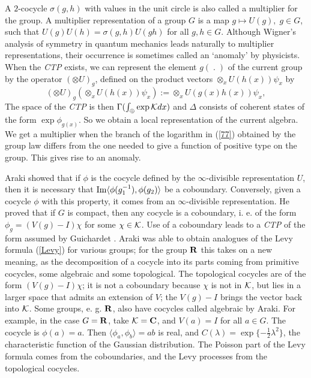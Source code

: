 A $2$-cocycle $\sigma(g,h)$ with values in the unit circle is also
called a multiplier for the group. A multiplier representation of a group
$G$ is a map $g\mapsto U(g),\;g\in G$, such that $U(g)U(h)=\sigma(g,h)U(gh)$
for all $g,h\in G$. Although Wigner's analysis of symmetry in quantum
mechanics leads naturally to multiplier representations, their occurrence
is sometimes called an `anomaly' by physicists.
When the {\em CTP} exists, we can represent the element
$g(\;.\;)$ of the current group by the operator $(\otimes U)_g$, defined on
the product vectors $\otimes_x U(h(x))\psi_x$ by
\begin{equation}
(\otimes U)_g(\otimes_x U(h(x))\psi_x):=\otimes_xU(g(x)h(x))\psi_x,
\label{current}
\end{equation}
The space of the {\em CTP} is then $\Gamma(\int_{\oplus}\exp{\cal K}dx)$
and $\Delta$ consists of coherent states of the form $\exp\phi_{g(x)}$.
So we obtain a local representation of the current algebra. We get a
multiplier when the branch of the logarithm in (\ref{77}) obtained by the
group law differs from the one needed to give a function of positive type on
the group. This gives rise to an anomaly.

Araki showed that if $\phi$ is the cocycle defined by the $\infty$-divisible
representation $U$, then it is necessary that ${\rm Im}\langle
\phi(g_1^{-1}),\phi(g_2)\rangle$ be a coboundary. Conversely, given a
cocycle $\phi$
with this property, it comes from an $\infty$-divisible representation.
He proved that if $G$ is compact, then any cocycle is a coboundary, i. e.
of the form $\phi_g=(V(g)-I)\chi$ for some $\chi\in{\cal K}$. Use of
a coboundary leads to a {\em CTP} of the form assumed by
Guichardet \cite{Guichardet}.
Araki was able to obtain
analogues of the Levy formula (\ref{Levy}) for various groups;
for the group ${\bf R}$ this takes on
a new meaning, as the decomposition of a cocycle into its parts
coming from primitive cocycles, some algebraic and some topological.
The topological cocycles are of the form $(V(g)-I)\chi$; it is not a
coboundary because $\chi$ is not in ${\cal K}$, but lies in a larger
space that admits an extension of $V$; the $V(g)-I$ brings the
vector back into ${\cal K}$. Some groups, e. g. ${\bf R}$, also have
cocycles called algebraic by Araki. For example, in the case $G={\bf R}$,
take ${\cal K}={\bf C}$, and $V(a)=I$ for all $a\in G$. The cocycle is
$\phi(a)=a$. Then $\langle\phi_a,\phi_b\rangle=ab$ is real, and $C(\lambda)
=\exp\{-\frac{1}{2}\lambda^2\}$, the characteristic function of the Gaussian
distribution. The Poisson part of the Levy formula comes from
the coboundaries, and the Levy processes from the topological cocycles.

